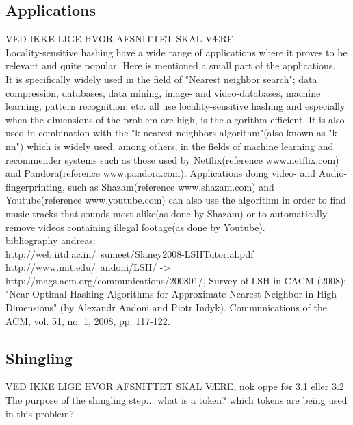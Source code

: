 \subsection{Applications}
VED IKKE LIGE HVOR AFSNITTET SKAL VÆRE\\
Locality-sensitive hashing have a wide range of applications where it proves to be relevant and quite popular. Here is mentioned a small part of the applications.  \\
It is specifically widely used in the field of "Nearest neighbor search"; data compression, databases, data mining, image- and video-databases, machine learning, pattern recognition, etc. all use locality-sensitive hashing and especially when the dimensions of the problem are high, is the algorithm efficient. 
It is also used in combination with the "k-nearest neighbors algorithm"(also known as "k-nn") which is widely used, among others, in the fields of machine learning and recommender systems such as those used by Netflix(reference www.netflix.com) and Pandora(reference www.pandora.com). Applications doing video- and Audio-fingerprinting, such as Shazam(reference www.shazam.com) and Youtube(reference www.youtube.com) can also use the algorithm in order to find music tracks that sounds most alike(as done by Shazam) or to automatically remove videos containing illegal footage(as done by Youtube).
\\
bibliography andreas: \\
http://web.iitd.ac.in/~sumeet/Slaney2008-LSHTutorial.pdf \\
http://www.mit.edu/~andoni/LSH/ -> http://mags.acm.org/communications/200801/, Survey of LSH in CACM (2008): "Near-Optimal Hashing Algorithms for Approximate Nearest Neighbor in High Dimensions" (by Alexandr Andoni and Piotr Indyk). Communications of the ACM, vol. 51, no. 1, 2008, pp. 117-122.

\subsection{Shingling}
VED IKKE LIGE HVOR AFSNITTET SKAL VÆRE, nok oppe før 3.1 eller 3.2\\
The purpose of the shingling step... what is a token? which tokens are being used in this problem?

